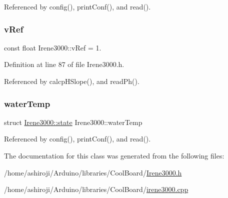 Referenced by config(), print\+Conf(), and read().

\mbox{\label{classIrene3000_a018e7ff9bee57e6d2b298667a668ba7e}} 
\subsubsection{\texorpdfstring{v\+Ref}{vRef}}
{\footnotesize\ttfamily const float Irene3000\+::v\+Ref = 1.\hspace{0.3cm}{\ttfamily [private]}}



Definition at line 87 of file Irene3000.\+h.



Referenced by calcp\+H\+Slope(), and read\+Ph().

\mbox{\label{classIrene3000_af05612c78c758ce9db316c75ad937130}} 
\subsubsection{\texorpdfstring{water\+Temp}{waterTemp}}
{\footnotesize\ttfamily struct \hyperlink{structIrene3000_1_1state}{Irene3000\+::state}  Irene3000\+::water\+Temp\hspace{0.3cm}{\ttfamily [private]}}



Referenced by config(), print\+Conf(), and read().



The documentation for this class was generated from the following files\+:\begin{DoxyCompactItemize}
\item 
/home/ashiroji/\+Arduino/libraries/\+Cool\+Board/\hyperlink{Irene3000_8h}{Irene3000.\+h}\item 
/home/ashiroji/\+Arduino/libraries/\+Cool\+Board/\hyperlink{irene3000_8cpp}{irene3000.\+cpp}\end{DoxyCompactItemize}
